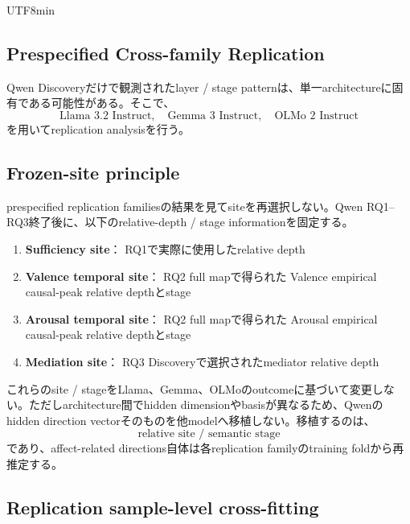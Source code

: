 \documentclass{article} %
\begin{document}
\begin{CJK*}{UTF8}{min}
\subsection{Prespecified Cross-family Replication}
\label{app:v3-confirmatory}

Qwen Discoveryだけで観測されたlayer / stage patternは、単一architectureに固有である可能性がある。そこで、
\[
\text{Llama 3.2 Instruct},
\quad
\text{Gemma 3 Instruct},
\quad
\text{OLMo 2 Instruct}
\]
を用いてreplication analysisを行う。


\subsection{Frozen-site principle}

prespecified replication familiesの結果を見てsiteを再選択しない。Qwen RQ1--RQ3終了後に、以下のrelative-depth / stage informationを固定する。

\begin{enumerate}
    \item \textbf{Sufficiency site}：
    RQ1で実際に使用したrelative depth

    \item \textbf{Valence temporal site}：
    RQ2 full mapで得られた
    Valence empirical causal-peak relative depthとstage

    \item \textbf{Arousal temporal site}：
    RQ2 full mapで得られた
    Arousal empirical causal-peak relative depthとstage

    \item \textbf{Mediation site}：
    RQ3 Discoveryで選択されたmediator relative depth
\end{enumerate}

これらのsite / stageをLlama、Gemma、OLMoのoutcomeに基づいて変更しない。ただしarchitecture間でhidden dimensionやbasisが異なるため、Qwenのhidden direction vectorそのものを他modelへ移植しない。移植するのは、
\[
\text{relative site / semantic stage}
\]
であり、affect-related directions自体は各replication familyのtraining foldから再推定する。


\subsection{Replication sample-level cross-fitting}


\end{CJK*}
\end{document}
